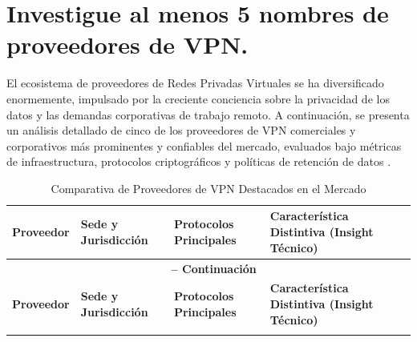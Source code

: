 \documentclass[a4paper,12pt]{article}
\begin{document}
\newpage
\section{Investigue al menos 5 nombres de proveedores de VPN.}

El ecosistema de proveedores de Redes Privadas Virtuales se ha diversificado enormemente, impulsado por la creciente conciencia sobre la privacidad de los datos y las demandas corporativas de trabajo remoto. A continuación, se presenta un análisis detallado de cinco de los proveedores de VPN comerciales y corporativos más prominentes y confiables del mercado, evaluados bajo métricas de infraestructura, protocolos criptográficos y políticas de retención de datos \cite{top10vpn_2026, xataka_vpn_2026, gizmodo_vpn}.

{
    \renewcommand{\arraystretch}{1.3}
    \begin{longtable}{|p{3cm}|p{3.5cm}|p{3cm}|p{5cm}|}
        \caption{Comparativa de Proveedores de VPN Destacados en el Mercado} \\
        \hline
        \textbf{Proveedor} & \textbf{Sede y Jurisdicción} & \textbf{Protocolos Principales} & \textbf{Característica Distintiva (Insight Técnico)} \\
        \hline
        \endfirsthead
        
        \multicolumn{4}{c}{{\bfseries \tablename\ \thetable{} -- Continuación}} \\
        \hline
        \textbf{Proveedor} & \textbf{Sede y Jurisdicción} & \textbf{Protocolos Principales} & \textbf{Característica Distintiva (Insight Técnico)} \\
        \hline
        \endhead
        
        \hline
        \endfoot
        
        \hline
        \endlastfoot


\end{longtable}}
\end{document}
